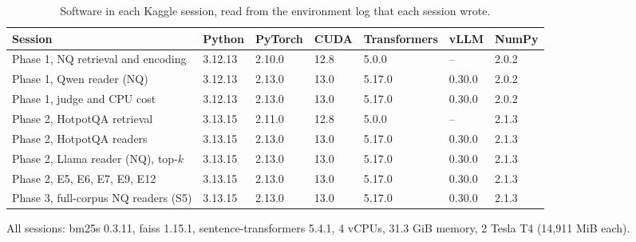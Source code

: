 \begin{table}[t]
\centering
\footnotesize
\caption{Software in each Kaggle session, read from the environment log that each session wrote.}
\label{tab:env}
\begin{tabular}{lllllll}
\toprule
Session & Python & PyTorch & CUDA & Transformers & vLLM & NumPy \\
\midrule
Phase 1, NQ retrieval and encoding & 3.12.13 & 2.10.0 & 12.8 & 5.0.0 & -- & 2.0.2 \\
Phase 1, Qwen reader (NQ) & 3.12.13 & 2.13.0 & 13.0 & 5.17.0 & 0.30.0 & 2.0.2 \\
Phase 1, judge and CPU cost & 3.12.13 & 2.13.0 & 13.0 & 5.17.0 & 0.30.0 & 2.0.2 \\
Phase 2, HotpotQA retrieval & 3.13.15 & 2.11.0 & 12.8 & 5.0.0 & -- & 2.1.3 \\
Phase 2, HotpotQA readers & 3.13.15 & 2.13.0 & 13.0 & 5.17.0 & 0.30.0 & 2.1.3 \\
Phase 2, Llama reader (NQ), top-$k$ & 3.13.15 & 2.13.0 & 13.0 & 5.17.0 & 0.30.0 & 2.1.3 \\
Phase 2, E5, E6, E7, E9, E12 & 3.13.15 & 2.13.0 & 13.0 & 5.17.0 & 0.30.0 & 2.1.3 \\
Phase 3, full-corpus NQ readers (S5) & 3.13.15 & 2.13.0 & 13.0 & 5.17.0 & 0.30.0 & 2.1.3 \\
\bottomrule
\end{tabular}
\par\smallskip\parbox{\linewidth}{\footnotesize All sessions: bm25s 0.3.11, faiss 1.15.1, sentence-transformers 5.4.1, 4 vCPUs, 31.3 GiB memory, 2 Tesla T4 (14,911 MiB each).}
\end{table}
